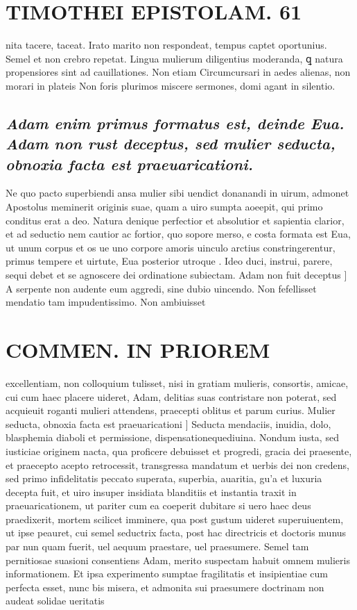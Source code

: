 \documentclass{article}
\begin{document}
\begin{pages}
\section*{TIMOTHEI EPISTOLAM. 61 }\pstart nita tacere, taceat. Irato marito non respondeat, tempus captet oportunius. Semel et non crebro repetat. Lingua mulierum diligentius moderanda, ꝗ natura propensiores sint ad cauillationes. Non etiam Circumcursari in aedes alienas, non morari in plateis Non foris plurimos miscere sermones, domi agant in silentio.  \pend
{}
{}
\subsection*{\textit{Adam enim primus formatus est, deinde Eua. Adam non rust deceptus, sed mulier seducta, obnoxia facta est praeuaricationi. }}\pstart Ne quo pacto superbiendi ansa mulier sibi uendict donanandi in uirum, admonet Apostolus meminerit originis suae, quam a uiro sumpta aoeepit, qui primo conditus erat a deo. Natura denique  perfectior et absolutior et sapientia clarior, et ad seductio nem cautior ac fortior, quo sopore merso, e costa formata est Eua, ut unum corpus et os ue uno corpore amoris uinculo arctius constringerentur, primus tempere et uirtute, Eua posterior utroque . Ideo duci, instrui, parere, sequi debet et se agnoscere dei ordinatione subiectam.  \pend\pstart Adam non fuit deceptus ] A serpente non audente eum aggredi, sine dubio uincendo. Non fefellisset mendatio tam impudentissimo. Non ambiuisset  \pend
\section*{COMMEN. IN PRIOREM }
\marginpar{[ p.62 ]}\pstart excellentiam, non colloquium tulisset, nisi in gratiam mulieris, consortis, amicae, cui cum haec placere uideret, Adam, delitias suas contristare non poterat, sed acquieuit roganti mulieri attendens, praecepti oblitus et parum curius.  \pend\pstart Mulier seducta, obnoxia facta est praeuaricationi ] Seducta mendaciis, inuidia, dolo, blasphemia diaboli et permissione, dispensationequediuina. Nondum iusta, sed iusticiae originem nacta, qua proficere debuisset et progredi, gracia dei praesente, et praecepto acepto retrocessit, transgressa mandatum et uerbis dei non credens, sed primo infidelitatis peccato superata, superbia, auaritia, gu’a et luxuria decepta fuit, et uiro insuper insidiata blanditiis et instantia traxit in praeuaricationem, ut pariter cum ea coeperit dubitare si uero haec deus praedixerit, mortem scilicet imminere, qua post gustum uideret superuiuentem, ut ipse peauret, cui semel seductrix facta, post hac directricis et doctoris munus par nun quam fuerit, uel aequum praestare, uel praesumere. Semel tam pernitiosae suasioni consentiens Adam, merito suspectam habuit omnem mulieris informationem. Et ipsa experimento sumptae fragilitatis et insipientiae cum perfecta esset, nunc bis misera, et admonita sui praesumere doctrinam non audeat solidae ueritatis  \pend

\end{pages}
\end{document}
